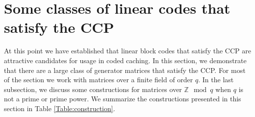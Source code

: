 \documentclass[journal,twocolumn]{IEEEtran}
\theoremstyle{definition}
\begin{document}
\section{Some classes of linear codes that satisfy the CCP}
\label{sec:LinearCode}
At this point we have established that linear block codes that satisfy the CCP are attractive candidates for usage in coded caching. In this section, we demonstrate that there are a large class of generator matrices that satisfy the CCP. For most of the section we work with matrices over a finite field of order $q$. In the last subsection, we discuss some constructions for matrices over $\mathbb{Z} \mod q$ when $q$ is not a prime or prime power. We summarize the constructions presented in this section in Table \ref{Table:construction}.
\end{document}
